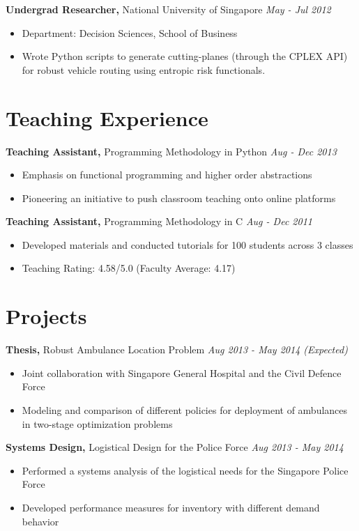 \documentclass[margin]{res}
\begin{document}
\begin{resume}
{\bf Undergrad Researcher,} National University of Singapore \hfill \textit{May - Jul 2012}
\begin{itemize} \itemsep -2pt
\item Department: Decision Sciences, School of Business
\item Wrote Python scripts to generate cutting-planes (through the CPLEX API) for robust vehicle routing using entropic risk functionals.
\end{itemize}

\section{Teaching Experience}
{\bf Teaching Assistant,} Programming Methodology in Python \hfill \textit{Aug - Dec 2013}
\begin{itemize} \itemsep -2pt
\item Emphasis on functional programming and higher order abstractions
\item Pioneering an initiative to push classroom teaching onto online platforms
\end{itemize}

{\bf Teaching Assistant,} Programming Methodology in C \hfill \textit{Aug - Dec 2011}
\begin{itemize} \itemsep -2pt
\item Developed materials and conducted tutorials for 100 students across 3 classes
\item Teaching Rating: 4.58/5.0 (Faculty Average: 4.17)
\end{itemize}

\section{Projects}
{\bf Thesis,} Robust Ambulance Location Problem \hfill \textit{Aug 2013 - May 2014 (Expected)}
\begin{itemize} \itemsep -2pt
\item Joint collaboration with Singapore General Hospital and the Civil Defence Force
\item Modeling and comparison of different policies for deployment of ambulances in two-stage optimization problems
\end{itemize}

{\bf Systems Design,} Logistical Design for the Police Force \hfill \textit{Aug 2013 - May 2014}
\begin{itemize} \itemsep -2pt
\item Performed a systems analysis of the logistical needs for the Singapore Police Force
\item Developed performance measures for inventory with different demand behavior
\end{itemize}


\end{resume}
\end{document}
